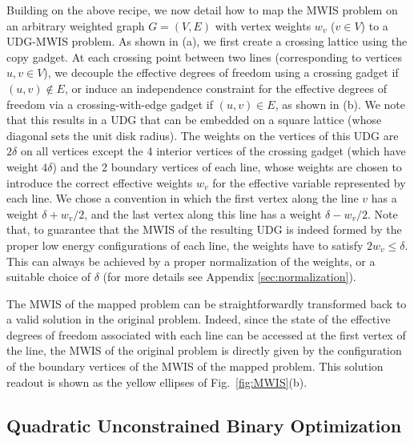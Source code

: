 Building on the above recipe, we now detail how to map the MWIS problem on an arbitrary weighted graph $G=(V,E)$ with vertex weights $w_v$ ($v\in V$) to a UDG-MWIS problem. As shown in (a), we first create a crossing lattice using the copy gadget.
At each crossing point between two lines (corresponding to vertices $u,v\in V$), we decouple the effective degrees of freedom using a crossing gadget if $(u,v)\notin E$, or induce an independence constraint for the effective degrees of freedom via a crossing-with-edge gadget if $(u,v)\in E$, as shown in (b). We note that this results in a UDG that can be embedded on a square lattice (whose diagonal sets the unit disk radius). The weights on the vertices of this UDG are $2\delta$ on all vertices except the 4 interior vertices of the crossing gadget (which have weight $4\delta$) and the 2 boundary vertices of each line, whose weights are chosen to introduce the correct effective weights $w_v$ for the effective variable represented by each line. We chose a convention in which the first vertex along the line $v$ has a weight $\delta+w_v/2$, and the last vertex along this line has a weight $\delta-w_v/2$. 
Note that, to guarantee that the MWIS of the resulting UDG is indeed formed by the proper low energy configurations of each line, the weights have to satisfy $2w_v\leq \delta$. This can always be achieved by a proper normalization of the weights, or a suitable choice of $\delta$ (for more details see Appendix \ref{sec:normalization}). 

The MWIS of the mapped problem can be straightforwardly transformed back to a valid solution in the original problem. Indeed, since the state of the effective degrees of freedom associated with each line can be accessed at the first vertex of the line, the MWIS of the original problem is directly given by the configuration of the boundary vertices of the MWIS of the mapped problem. This solution readout is shown as the yellow ellipses of Fig.~\ref{fig:MWIS}(b).


\subsection{Quadratic Unconstrained Binary Optimization}\label{sec:Ising}

